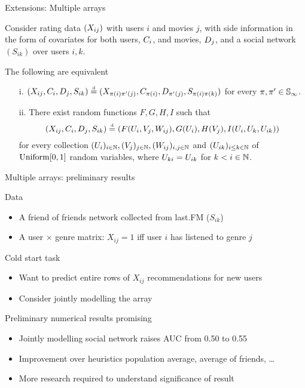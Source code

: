 \begin{frame}{Extensions: Multiple arrays}
  \begin{block}{}
Consider rating data $(X_{ij})$ with users $i$ and movies $j$, with side information in the form of covariates for both users, $C_i$, and movies, $D_j$, and a social network $(S_{ik})$ over users $i,k$.
\end{block}
  \begin{block}{}
\begin{cor}
The following are equivalent
\begin{enumerate}
\item[i.] $
(X_{ij}, C_i, D_j, S_{ik}) \stackrel{\mbox{\tiny d}}{=}
(X_{\pi(i)\pi'(j)}, C_{\pi(i)}, D_{\pi'(j)}, S_{\pi(i)\pi(k)})$ 
for every $\pi,\pi' \in \mathbb{S}_{\infty}$.
\item[ii.] There exist random functions $F,G,H,I$ such that
\[
(X_{ij}, C_i, D_j, S_{ik}) \stackrel{\mbox{\tiny d}}{=} (F(U_i,V_j,W_{ij}), G(U_i), H(V_j), I(U_i,U_k,U_{ik}))\nonumber
\]
for every collection $(U_i)_{i\in\mathbb{N}}, (V_j)_{j\in\mathbb{N}}, (W_{ij})_{i, j\in\mathbb{N}}$ and $(U_{ik})_{i\le k\in\mathbb{N}}$ of \iid $\mbox{\rm Uniform}[0,1]$ random variables, where $U_{ki} = U_{ik}$ for $k < i \in \mathbb{N}$.
\end{enumerate}
\end{cor}
  \end{block}
\end{frame}

\begin{frame}{Multiple arrays: preliminary results}
 \begin{block}{Data}
   \begin{itemize}
   \item A friend of friends network collected from last.FM ($S_{ik}$)
   \item A user $\times$ genre matrix: $X_{ij} = 1$ iff user $i$ has listened to genre $j$
   \end{itemize}
 \end{block}
 \begin{block}{Cold start task}
   \begin{itemize}
     \item Want to predict entire rows of $X_{ij}$ \ie recommendations for new users
     \item Consider jointly modelling the array
   \end{itemize}
 \end{block}
 \begin{block}{Preliminary numerical results promising}
   \begin{itemize}
     \item Jointly modelling social network raises AUC from 0.50 to 0.55
     \item Improvement over heuristics \eg population average, average of friends, \ldots
     \item More research required to understand significance of result
   \end{itemize} 
 \end{block}
\end{frame}

